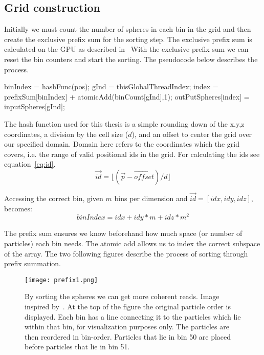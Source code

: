 \subsection{Grid construction}
Initially we must count
the number of spheres in each bin in the grid and then create the exclusive prefix sum for the sorting
step. The exclusive prefix sum is calculated on the GPU as described in~\cite{gpugems}
With the exclusive prefix sum we can reset the bin counters and start the sorting.
The pseudocode below describes
the process.

\begin{algorithm}[H]
  \begin{algorithmic}[1]
  \State binIndex = hashFunc(pos);
  \State gInd = thisGlobalThreadIndex;
  \State index = prefixSum[binIndex] + atomicAdd(binCount[gInd],1);
  \State outPutSpheres[index] = inputSpheres[gInd];
\end{algorithmic}
\end{algorithm}

The hash function used for this thesis is a simple rounding down of the x,y,z coordinates, a
division by the cell size ($d$), and an offset to center the grid over our specified domain.
Domain here refers to the coordinates which the grid covers, i.e. the range of valid positional ids
in the grid. For calculating the ids see equation~\ref{eq:id}.
\begin{equation}\label{eq:id}
  \vec{id} = \lfloor(\vec{p}-\vec{offset})/d\rfloor
\end{equation}

Accessing the correct bin, given $m$ bins per dimension and $\vec{id} = [idx,idy,idz]$, becomes:
\begin{equation}
  binIndex = idx + idy*m + idz*m^2
\end{equation}

The prefix sum ensures we know beforehand how much space (or number of particles)
each bin needs. The atomic add allows us to index the correct subspace of the
array. The two following figures describe the process of sorting through prefix summation.

\begin{figure}[H]
  \centering
  \texttt{[image: prefix1.png]}
  \caption{By sorting the spheres we can get more coherent reads. Image inspired by~\cite{fastnearest}.
  At the top of the figure the original particle order is displayed. Each bin has a line connecting it to the particles which lie within that bin, for visualization purposes only.
  The particles are then reordered in bin-order. Particles that lie in bin 50 are placed before particles that lie in bin 51.}
\end{figure}

